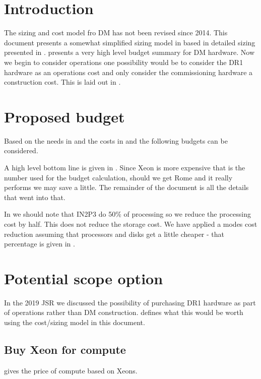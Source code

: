 \section{Introduction}
The sizing and cost model fro DM has not been revised since 2014. This document presents
a somewhat simplified sizing model in  based in detailed sizing presented in .
 presents a very high level budget summary for
DM hardware.
Now we begin to consider operations one possibility would be to consider the DR1 hardware
as an operations cost and only consider the commissioning hardware a construction cost.
This is laid out in .

\section{Proposed budget}\label{sec:cost}
Based on the needs in  and the costs in  and 
the following budgets can be considered.

A high level bottom line is given in .
Since Xeon is more expensive that is the number used for the budget calculation, should we get Rome and it really performs we may save a little.
The remainder of the document is all the details that went into that.



In  we should note that IN2P3 do 50\% of processing so we reduce the processing cost by half. This does not
reduce the storage cost. We have applied a modes cost reduction assuming that processors  and disks get a little cheaper - that
percentage is given in .

\section{Potential scope option} \label{sec:scope}
In the 2019 JSR we discussed the possibility of purchasing DR1 hardware as part of operations
rather than DM construction. 
defines what this would be worth using the cost/sizing model in this document.



\subsection{Buy Xeon for compute} \label{sec:xeon}
 gives the price of compute based on Xeons.


